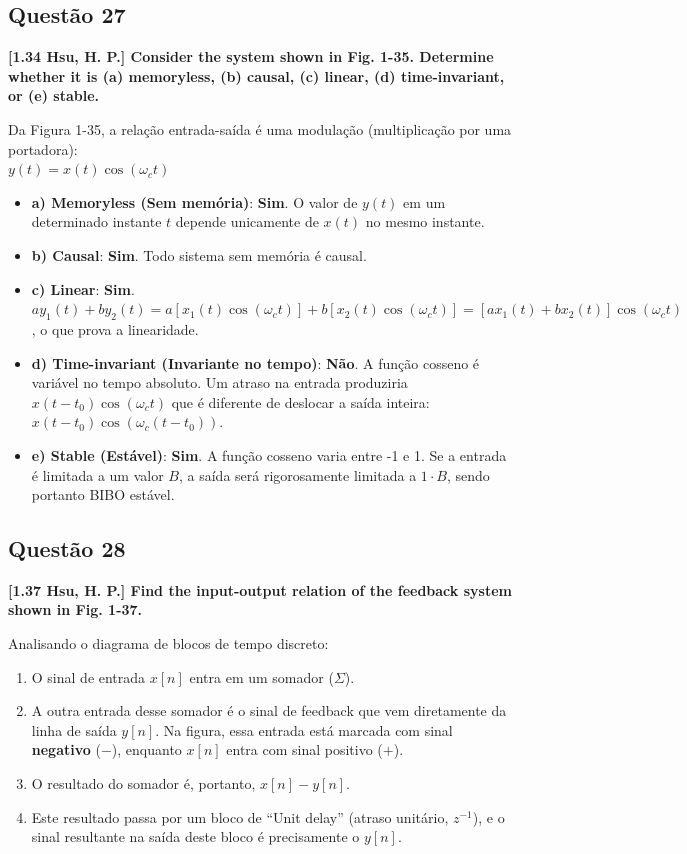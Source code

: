 \subsection{Questão 27}\label{questuxe3o-27}

\textbf{{[}1.34 Hsu, H. P.{]} Consider the system shown in Fig. 1-35. Determine whether it is (a) memoryless, (b) causal, (c) linear, (d) time-invariant, or (e) stable.}

Da Figura 1-35, a relação entrada-saída é uma modulação (multiplicação por uma portadora):\\
\(y(t) = x(t) \cos(\omega_c t)\)

\begin{itemize}
\tightlist
\item
  \textbf{a) Memoryless (Sem memória)}: \textbf{Sim}. O valor de \(y(t)\) em um determinado instante \(t\) depende unicamente de \(x(t)\) no mesmo instante.
\item
  \textbf{b) Causal}: \textbf{Sim}. Todo sistema sem memória é causal.
\item
  \textbf{c) Linear}: \textbf{Sim}. \(ay_1(t) + by_2(t) = a [x_1(t)\cos(\omega_c t)] + b [x_2(t)\cos(\omega_c t)] = [a x_1(t) + b x_2(t)] \cos(\omega_c t)\), o que prova a linearidade.
\item
  \textbf{d) Time-invariant (Invariante no tempo)}: \textbf{Não}. A função cosseno é variável no tempo absoluto. Um atraso na entrada produziria \(x(t-t_0)\cos(\omega_c t)\) que é diferente de deslocar a saída inteira: \(x(t-t_0)\cos(\omega_c(t-t_0))\).
\item
  \textbf{e) Stable (Estável)}: \textbf{Sim}. A função cosseno varia entre -1 e 1. Se a entrada é limitada a um valor \(B\), a saída será rigorosamente limitada a \(1 \cdot B\), sendo portanto BIBO estável.
\end{itemize}

\subsection{Questão 28}\label{questuxe3o-28}

\textbf{{[}1.37 Hsu, H. P.{]} Find the input-output relation of the feedback system shown in Fig. 1-37.}

Analisando o diagrama de blocos de tempo discreto:

\begin{enumerate}
\def\labelenumi{\arabic{enumi}.}
\tightlist
\item
  O sinal de entrada \(x[n]\) entra em um somador (\(\Sigma\)).
\item
  A outra entrada desse somador é o sinal de feedback que vem diretamente da linha de saída \(y[n]\). Na figura, essa entrada está marcada com sinal \textbf{negativo} (\(-\)), enquanto \(x[n]\) entra com sinal positivo (\(+\)).
\item
  O resultado do somador é, portanto, \(x[n] - y[n]\).
\item
  Este resultado passa por um bloco de ``Unit delay'' (atraso unitário, \(z^{-1}\)), e o sinal resultante na saída deste bloco é precisamente o \(y[n]\).
\end{enumerate}

